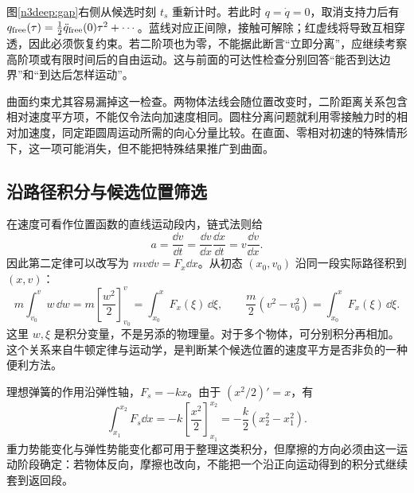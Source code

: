 图\ref{n3deep:gap}右侧从候选时刻 $t_s$ 重新计时。若此时 $q=\dot q=0$，取消支持力后有 $q_{\rm free}(\tau)=\tfrac12\ddot q_{\rm free}(0)\tau^2+\cdots$。蓝线对应正间隙，接触可解除；红虚线将导致互相穿透，因此必须恢复约束。若二阶项也为零，不能据此断言“立即分离”，应继续考察高阶项或有限时间后的自由运动。这与前面的可达性检查分别回答“能否到达边界”和“到达后怎样运动”。

曲面约束尤其容易漏掉这一检查。两物体法线会随位置改变时，二阶距离关系包含相对速度平方项，不能仅令法向加速度相同。圆柱分离问题就利用零接触力时的相对加速度，同定距圆周运动所需的向心分量比较。在直面、零相对初速的特殊情形下，这一项可能消失，但不能把特殊结果推广到曲面。

\subsection{沿路径积分与候选位置筛选}
在速度可看作位置函数的直线运动段内，链式法则给
\[
a=\frac{\dd v}{\dd t}=\frac{\dd v}{\dd x}\frac{\dd x}{\dd t}
=v\frac{\dd v}{\dd x}.
\]
因此第二定律可以改写为 $mv\dd v=F_x\dd x$。从初态 $(x_0,v_0)$ 沿同一段实际路径积到 $(x,v)$：
\[
m\int_{v_0}^{v}w\,\dd w
=m\left[\frac{w^2}{2}\right]_{v_0}^{v}
=\int_{x_0}^{x}F_x(\xi)\,\dd\xi,
\qquad
\frac m2(v^2-v_0^2)=\int_{x_0}^{x}F_x(\xi)\,\dd\xi.
\]
这里 $w,\xi$ 是积分变量，不是另添的物理量。对于多个物体，可分别积分再相加。这个关系来自牛顿定律与运动学，是判断某个候选位置的速度平方是否非负的一种便利方法。

理想弹簧的作用沿弹性轴，$F_s=-kx$。由于 $(x^2/2)'=x$，有
\[
\int_{x_1}^{x_2}F_s\dd x
=-k\left[\frac{x^2}{2}\right]_{x_1}^{x_2}
=-\frac k2(x_2^2-x_1^2).
\]
重力势能变化与弹性势能变化都可用于整理这类积分，但摩擦的方向必须由这一运动阶段确定：若物体反向，摩擦也改向，不能把一个沿正向运动得到的积分式继续套到返回段。

